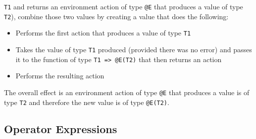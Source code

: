 \documentclass[diploma]{softlab-thesis}
\begin{document}
\verb|T1| and returns an environment action of type \verb|@E| that produces
a value of type \verb|T2|), combine those two values by creating a value that
does the following:
\begin{itemize}
\item
Performs the first action that produces a value of type \verb|T1|

\item
Takes the value of type \verb|T1| produced (provided there was no error) and
passes it to the function of type \verb|T1 => @E(T2)| that then returns an
action

\item
Performs the resulting action
\end{itemize}
The overall effect is an environment action  of type \verb|@E| that produces
a value is of type \verb|T2| and therefore the new value is of type
\verb|@E(T2)|.

\newpage

\subsection{Operator Expressions}
\end{document}
